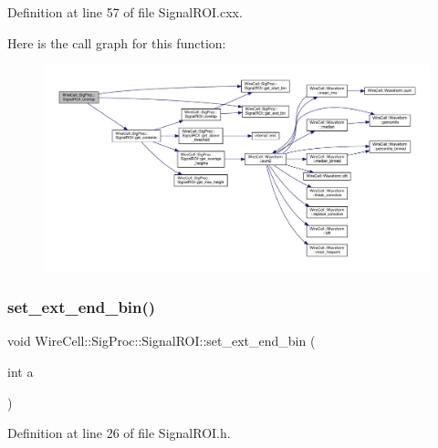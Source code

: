 Definition at line 57 of file Signal\+R\+O\+I.\+cxx.

Here is the call graph for this function\+:
\nopagebreak
\begin{figure}[H]
\begin{center}
\leavevmode
\includegraphics[width=350pt]{class_wire_cell_1_1_sig_proc_1_1_signal_r_o_i_af714fd2a4bba4597bea27d2ab34f0d8d_cgraph}
\end{center}
\end{figure}
\mbox{\label{class_wire_cell_1_1_sig_proc_1_1_signal_r_o_i_a1057a64f15a6093ab46679c4d54524ba}} 
\subsubsection{\texorpdfstring{set\+\_\+ext\+\_\+end\+\_\+bin()}{set\_ext\_end\_bin()}}
{\footnotesize\ttfamily void Wire\+Cell\+::\+Sig\+Proc\+::\+Signal\+R\+O\+I\+::set\+\_\+ext\+\_\+end\+\_\+bin (\begin{DoxyParamCaption}\item[{int}]{a }\end{DoxyParamCaption})\hspace{0.3cm}{\ttfamily [inline]}}



Definition at line 26 of file Signal\+R\+O\+I.\+h.

